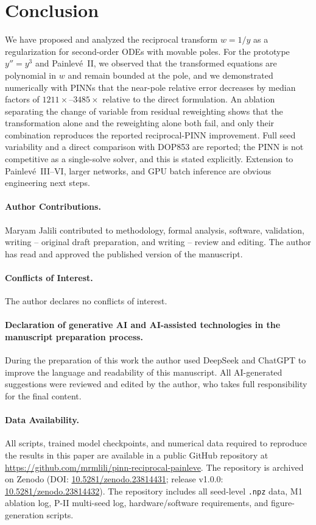 \documentclass[a4paper, 10pt]{article}
\theoremstyle{definition}
\begin{document}
\section{Conclusion}
\label{sec:conclusion}



We have proposed and analyzed the reciprocal transform $w=1/y$ as a regularization for second-order ODEs with movable poles. For the prototype $y''=y^3$ and Painlev\'e~II, we observed that the transformed equations are polynomial in $w$ and remain bounded at the pole, and we demonstrated numerically with PINNs that the near-pole relative error decreases by median factors of $1211\times$--$3485\times$ relative to the direct formulation. An ablation separating the change of variable from residual reweighting shows that the transformation alone and the reweighting alone both fail, and only their combination reproduces the reported reciprocal-PINN improvement. Full seed variability and a direct comparison with DOP853 are reported; the PINN is not competitive as a single-solve solver, and this is stated explicitly. Extension to Painlev\'e~III--VI, larger networks, and GPU batch inference are obvious engineering next steps.

\paragraph{Author Contributions.} Maryam Jalili contributed to methodology, formal analysis, software, validation, writing – original draft preparation, and writing – review and editing. The author has read and approved the published version of the manuscript.

\paragraph{Conflicts of Interest.} The author declares no conflicts of interest.

\paragraph{Declaration of generative AI and AI-assisted technologies in the manuscript preparation process.}
During the preparation of this work the author used DeepSeek and ChatGPT to improve the language and readability of this manuscript. All AI-generated suggestions were reviewed and edited by the author, who takes full responsibility for the final content.

\paragraph{Data Availability.}
All scripts, trained model checkpoints, and numerical data required to reproduce the results in this paper are available in a public GitHub repository at \url{https://github.com/mrmlili/pinn-reciprocal-painleve}. The repository is archived on Zenodo (DOI: \mbox{\href{https://doi.org/10.5281/zenodo.23814431}{10.5281/zenodo.23814431}}; release v1.0.0: \mbox{\href{https://doi.org/10.5281/zenodo.23814432}{10.5281/zenodo.23814432}}). The repository includes all seed-level \texttt{.npz} data, M1 ablation log, P-II multi-seed log, hardware/software requirements, and figure-generation scripts.
\end{document}
